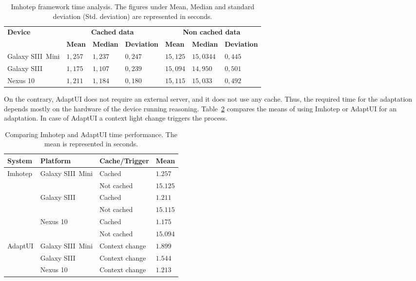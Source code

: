 \begin{table}[H]
 \caption{Imhotep framework time analysis. The figures under Mean, Median and
 standard deviation (Std. deviation) are represented in seconds.}
 \label{tbl:imhotep_timing}
 \footnotesize
 \centering
\begin{tabular}{l l l l l l l}
  \hline 
  \textbf{Device} & \multicolumn{3}{c}{\textbf{Cached 
  data}} & \multicolumn{3}{c}{\textbf{Non cached data}}\\
  & \textbf{Mean} & \textbf{Median} & \textbf{Deviation} &  \textbf{Mean} 
  & \textbf{Median} & \textbf{Deviation}\\
  \hline    
  Galaxy SIII~Mini & $1,257$ & $1,237$ & $0,247$ & $15,125$ & $15,0344$ & 
$0,445$ \\
%   
  Galaxy SIII & $1,175$ & $1,107$ & $0,239$ & $15,094$ & $14,950$ & $0,501$ \\
%   
  Nexus 10 & $1,211$ & $1,184$ & $0,180$ & $15,115$ & $15,033$ & $0,492$ \\
 \hline
\end{tabular}
\end{table}

On the contrary, AdaptUI does not require an external server, and it does not 
use any cache. Thus, the required time for the adaptation depends mostly on the 
hardware of the device running reasoning. Table~\ref{tbl:imhotep_vs_adaptui}
compares the means of using Imhotep or AdaptUI for an adaptation. In case of 
AdaptUI a context light change triggers the process.

\begin{table}[H]
 \caption{Comparing Imhotep and AdaptUI time performance. The mean is 
represented in seconds.}
 \label{tbl:imhotep_vs_adaptui}
 \footnotesize
 \centering
\begin{tabular}{l l l l}
  \hline 
  \textbf{System} & \textbf{Platform} & \textbf{Cache/Trigger} & \textbf{Mean}\\
  \hline
  Imhotep 	& Galaxy SIII~Mini	& Cached		& $1.257$\\
		&  			& Not cached		& $15.125$\\
		& Galaxy SIII 		& Cached		& $1.211$\\
		&  			& Not cached		& $15.115$\\
		& Nexus 10 		& Cached		& $1.175$\\
		&  			& Not cached		& $15.094$\\
  \hline
  AdaptUI 	& Galaxy SIII~Mini	& Context change	& $1.899$\\
		& Galaxy SIII		& Context change	& $1.544$\\
 		& Nexus 10 		& Context change	& $1.213$\\
  \hline
\end{tabular}
\end{table}

